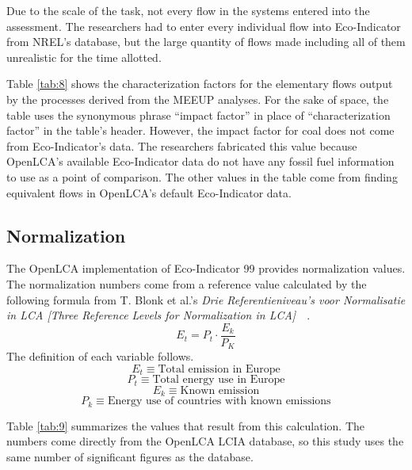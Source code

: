 \documentclass[final,journal,10pt,letterpaper,oneside,twocolumn,compsoc]%
{IEEEtran}
\begin{document}
Due to the scale of the task, not every flow in the systems entered into the
assessment. The researchers had to enter every individual flow into
Eco-Indicator from NREL's database, but the large quantity of flows made
including all of them unrealistic for the time allotted.



Table \ref{tab:8} shows the characterization factors for the elementary
flows output by the
processes derived from the MEEUP analyses. For the sake of space, the table uses
the synonymous phrase ``impact factor'' in place of ``characterization factor''
in the table's header. However, the impact factor for coal does not come
from Eco-Indicator's data. The
researchers fabricated this value because OpenLCA's
available Eco-Indicator data do
not have any fossil fuel information to use as a point of comparison. The other
values in
the table come from finding equivalent flows in OpenLCA's default Eco-Indicator
data.

\subsection{Normalization}
The OpenLCA implementation of Eco-Indicator 99 provides
normalization values. The normalization numbers come from a reference value
calculated by the following formula from T. Blonk et al.'s \textit{Drie
Referentieniveau's voor Normalisatie in LCA [Three Reference Levels for
Normalization in LCA]}~\cite{blonk}~\cite{pre-annex}. 
\begin{equation}
  E_t = P_t \cdot \frac{E_k}{P_K}
\end{equation}
The definition of each variable follows.
\begin{equation}
  E_t \equiv \textrm{Total emission in Europe}
\end{equation}
\begin{equation}
  P_t \equiv \textrm{Total energy use in Europe}
\end{equation}
\begin{equation}
  E_k \equiv \textrm{Known emission}
\end{equation}
\begin{equation}
  P_k \equiv \textrm{Energy use of countries with known emissions}
\end{equation}

Table \ref{tab:9} summarizes the values that result from this calculation. The
numbers come directly from the OpenLCA LCIA database, so this
study uses the same number of significant figures as the database.
\end{document}
